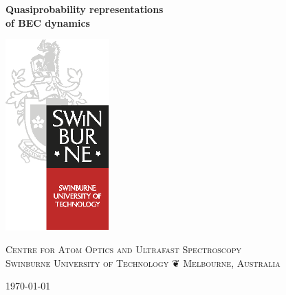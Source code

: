 
\begin{titlepage}
\begin{flushleft}

\vspace{1cm}

\noindent\textbf{\HUGE\captionfont Quasiprobability representations \\ of BEC dynamics}

\vspace{2cm}


\vspace{3cm}


\vfill

\includegraphics[width=4cm]{swinburne_logo_and_coa.eps}

\noindent\textsc{Centre for Atom Optics and Ultrafast Spectroscopy \\
Swinburne University of Technology ❦ Melbourne, Australia \\}

\vspace{0.5cm}

\noindent\textsc{\today}

\end{flushleft}
\end{titlepage}





